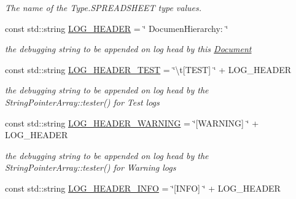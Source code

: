 \begin{DoxyCompactItemize}
\begin{DoxyCompactList}\small\item\em The name of the Type.\-S\-P\-R\-E\-A\-D\-S\-H\-E\-E\-T type values. \end{DoxyCompactList}\item 
\hypertarget{namespacedocs_a0a00c87ee0f345e683ff069a02063744}{const std\-::string \hyperlink{namespacedocs_a0a00c87ee0f345e683ff069a02063744}{L\-O\-G\-\_\-\-H\-E\-A\-D\-E\-R} = \char`\"{} Documen\-Hierarchy\-: \char`\"{}}\label{namespacedocs_a0a00c87ee0f345e683ff069a02063744}

\begin{DoxyCompactList}\small\item\em the debugging string to be appended on log head by this \hyperlink{classdocs_1_1Document}{Document} \end{DoxyCompactList}\item 
\hypertarget{namespacedocs_aef79f9b4462aa2823cf087845d6538ac}{const std\-::string \hyperlink{namespacedocs_aef79f9b4462aa2823cf087845d6538ac}{L\-O\-G\-\_\-\-H\-E\-A\-D\-E\-R\-\_\-\-T\-E\-S\-T} = \char`\"{}\textbackslash{}t\mbox{[}T\-E\-S\-T\mbox{]} \char`\"{} + L\-O\-G\-\_\-\-H\-E\-A\-D\-E\-R}\label{namespacedocs_aef79f9b4462aa2823cf087845d6538ac}

\begin{DoxyCompactList}\small\item\em the debugging string to be appended on log head by the String\-Pointer\-Array\-::tester() for Test logs \end{DoxyCompactList}\item 
\hypertarget{namespacedocs_a2b31c3722f8c95ab2077b81a482ed12f}{const std\-::string \hyperlink{namespacedocs_a2b31c3722f8c95ab2077b81a482ed12f}{L\-O\-G\-\_\-\-H\-E\-A\-D\-E\-R\-\_\-\-W\-A\-R\-N\-I\-N\-G} = \char`\"{}\mbox{[}W\-A\-R\-N\-I\-N\-G\mbox{]} \char`\"{} + L\-O\-G\-\_\-\-H\-E\-A\-D\-E\-R}\label{namespacedocs_a2b31c3722f8c95ab2077b81a482ed12f}

\begin{DoxyCompactList}\small\item\em the debugging string to be appended on log head by the String\-Pointer\-Array\-::tester() for Warning logs \end{DoxyCompactList}\item 
\hypertarget{namespacedocs_a6b1de40afeb89c26d19404f0535ca62b}{const std\-::string \hyperlink{namespacedocs_a6b1de40afeb89c26d19404f0535ca62b}{L\-O\-G\-\_\-\-H\-E\-A\-D\-E\-R\-\_\-\-I\-N\-F\-O} = \char`\"{}\mbox{[}I\-N\-F\-O\mbox{]} \char`\"{} + L\-O\-G\-\_\-\-H\-E\-A\-D\-E\-R}\label{namespacedocs_a6b1de40afeb89c26d19404f0535ca62b}


\end{DoxyCompactItemize}

